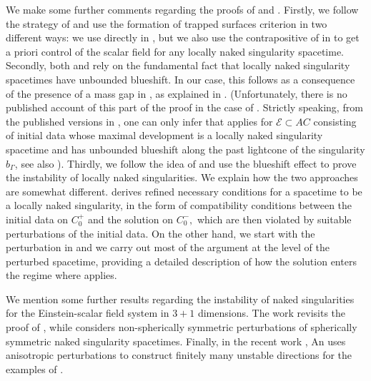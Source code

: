 \documentclass[11pt]{article}
\numberwithin{equation}{section}
\begin{document}
We make some further comments regarding the proofs of  and . Firstly, we follow the strategy of \cite{ChrWCC} and use the formation of trapped surfaces criterion in two different ways: we use  directly in , but we also use the contrapositive of  in  to get a priori control of the scalar field for any locally naked singularity spacetime. Secondly, both  and  rely on the fundamental fact that locally naked singularity spacetimes have unbounded blueshift. In our case, this follows as a consequence of the presence of a mass gap in , as explained in . (Unfortunately, there is no published account of this part of the proof in the case of . Strictly speaking, from the published versions in \cite{ChrWCC,C99-GL}, one can only infer that  applies for $\mathcal{E}\subset AC$ consisting of initial data whose maximal development is a locally naked singularity spacetime and has unbounded blueshift along the past lightcone of the singularity $b_{\Gamma}$, see also \cite{Wccsurvey}). %
Thirdly, we follow the idea of \cite{ChrWCC} and use the blueshift effect to prove the instability of locally naked singularities. We explain how the two approaches are somewhat different. \cite{ChrWCC} derives refined necessary conditions for a spacetime to be a locally naked singularity, in the form of compatibility conditions between the initial data on $C_0^+$ and the solution on $C_0^-,$ which are then violated by suitable perturbations of the initial data. On the other hand, we start with the perturbation in  and we carry out most of the argument at the level of the perturbed spacetime, providing a detailed description of how the solution enters the regime where  applies.



We mention some further results regarding the instability of naked singularities for the Einstein-scalar field system in $3+1$ dimensions. The work \cite{LiuLi} revisits the proof of \cite{ChrWCC}, while \cite{LiuLi2} considers non-spherically symmetric perturbations of spherically symmetric naked singularity spacetimes. Finally, in the recent work \cite{An}, An uses anisotropic perturbations to construct finitely many unstable directions for the examples of \cite{C94}.
\end{document}
